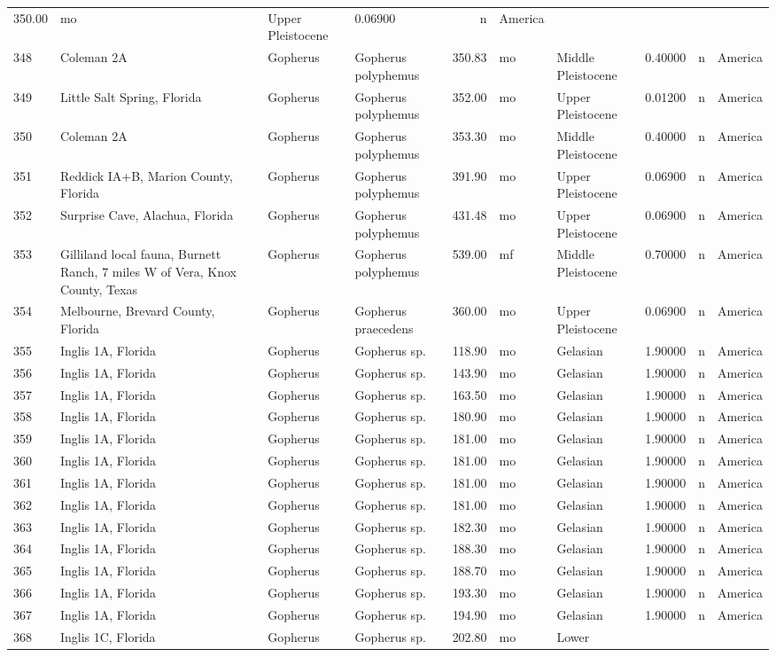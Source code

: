\documentclass[]{article}
\begin{document}
\begin{longtable}[]{@{}llllrllrll@{}}
350.00 & mo & Upper Pleistocene & 0.06900 & n & America\tabularnewline
348 & Coleman 2A & Gopherus & Gopherus polyphemus & 350.83 & mo & Middle
Pleistocene & 0.40000 & n & America\tabularnewline
349 & Little Salt Spring, Florida & Gopherus & Gopherus polyphemus &
352.00 & mo & Upper Pleistocene & 0.01200 & n & America\tabularnewline
350 & Coleman 2A & Gopherus & Gopherus polyphemus & 353.30 & mo & Middle
Pleistocene & 0.40000 & n & America\tabularnewline
351 & Reddick IA+B, Marion County, Florida & Gopherus & Gopherus
polyphemus & 391.90 & mo & Upper Pleistocene & 0.06900 & n &
America\tabularnewline
352 & Surprise Cave, Alachua, Florida & Gopherus & Gopherus polyphemus &
431.48 & mo & Upper Pleistocene & 0.06900 & n & America\tabularnewline
353 & Gilliland local fauna, Burnett Ranch, 7 miles W of Vera, Knox
County, Texas & Gopherus & Gopherus polyphemus & 539.00 & mf & Middle
Pleistocene & 0.70000 & n & America\tabularnewline
354 & Melbourne, Brevard County, Florida & Gopherus & Gopherus
praecedens & 360.00 & mo & Upper Pleistocene & 0.06900 & n &
America\tabularnewline
355 & Inglis 1A, Florida & Gopherus & Gopherus sp. & 118.90 & mo &
Gelasian & 1.90000 & n & America\tabularnewline
356 & Inglis 1A, Florida & Gopherus & Gopherus sp. & 143.90 & mo &
Gelasian & 1.90000 & n & America\tabularnewline
357 & Inglis 1A, Florida & Gopherus & Gopherus sp. & 163.50 & mo &
Gelasian & 1.90000 & n & America\tabularnewline
358 & Inglis 1A, Florida & Gopherus & Gopherus sp. & 180.90 & mo &
Gelasian & 1.90000 & n & America\tabularnewline
359 & Inglis 1A, Florida & Gopherus & Gopherus sp. & 181.00 & mo &
Gelasian & 1.90000 & n & America\tabularnewline
360 & Inglis 1A, Florida & Gopherus & Gopherus sp. & 181.00 & mo &
Gelasian & 1.90000 & n & America\tabularnewline
361 & Inglis 1A, Florida & Gopherus & Gopherus sp. & 181.00 & mo &
Gelasian & 1.90000 & n & America\tabularnewline
362 & Inglis 1A, Florida & Gopherus & Gopherus sp. & 181.00 & mo &
Gelasian & 1.90000 & n & America\tabularnewline
363 & Inglis 1A, Florida & Gopherus & Gopherus sp. & 182.30 & mo &
Gelasian & 1.90000 & n & America\tabularnewline
364 & Inglis 1A, Florida & Gopherus & Gopherus sp. & 188.30 & mo &
Gelasian & 1.90000 & n & America\tabularnewline
365 & Inglis 1A, Florida & Gopherus & Gopherus sp. & 188.70 & mo &
Gelasian & 1.90000 & n & America\tabularnewline
366 & Inglis 1A, Florida & Gopherus & Gopherus sp. & 193.30 & mo &
Gelasian & 1.90000 & n & America\tabularnewline
367 & Inglis 1A, Florida & Gopherus & Gopherus sp. & 194.90 & mo &
Gelasian & 1.90000 & n & America\tabularnewline
368 & Inglis 1C, Florida & Gopherus & Gopherus sp. & 202.80 & mo & Lower

\end{longtable}
\end{document}
